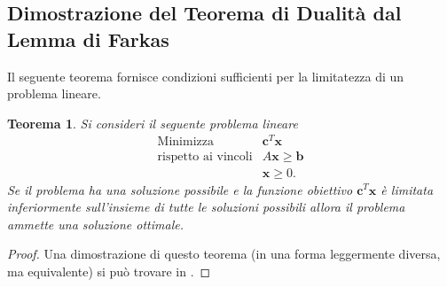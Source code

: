 \documentclass[italian, letter paper, 12pt, reqno]{article}
\theoremstyle{myteo}
\newtheorem{theorem}{Teorema}[section]
\numberwithin{equation}{section}
\begin{document}
\subsection{Dimostrazione del Teorema di Dualità dal Lemma di Farkas}
\label{subsec:dim_dualità}

Il seguente teorema fornisce condizioni sufficienti per la limitatezza di un problema lineare.

\begin{theorem}
  \label{teo:condizioni_sufficienti}
  Si consideri il seguente problema lineare
  \begin{equation*}
    \begin{array}{ll}
      \text{Minimizza} & \mathbf{c}^T\mathbf{x}\\
      \text{rispetto ai vincoli} & A\mathbf{x} \ge \mathbf{b}\\
                        & \mathbf{x} \ge 0.
    \end{array}
  \end{equation*}
  Se il problema ha una soluzione possibile e la funzione obiettivo \(\mathbf{c}^T\mathbf{x}\) è limitata \emph{inferiormente} sull'insieme di tutte le soluzioni possibili allora il problema ammette una soluzione ottimale.
\end{theorem}

\begin{proof}
  Una dimostrazione di questo teorema (in una forma leggermente diversa, ma equivalente) si può trovare in \cite[Theorem 4.2.3]{understanding_linear_programming}.
\end{proof}
\end{document}

